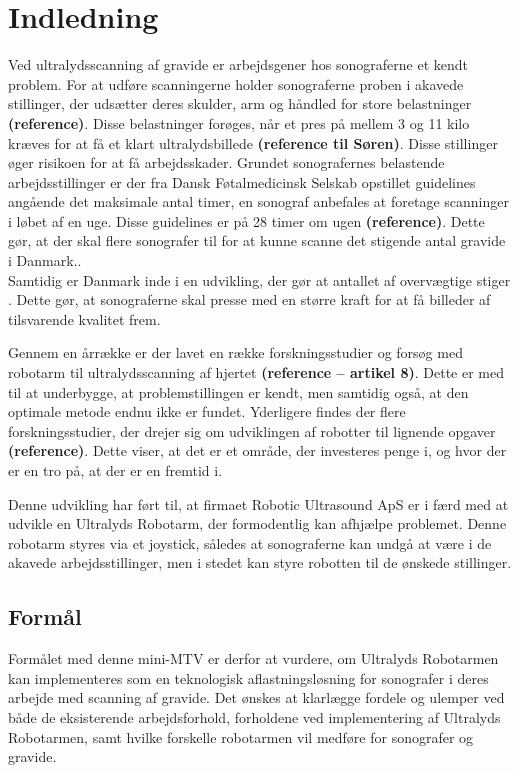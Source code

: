 \chapter{Indledning} 
Ved ultralydsscanning af gravide er arbejdsgener hos sonograferne et kendt problem. For at udføre scanningerne holder sonograferne proben i akavede stillinger, der udsætter deres skulder, arm og håndled for store belastninger \textbf{(reference)}. Disse belastninger forøges, når et pres på mellem 3 og 11 kilo kræves for at få et klart ultralydsbillede \textbf{(reference til Søren)}. Disse stillinger øger risikoen for at få arbejdsskader. Grundet sonografernes belastende arbejdsstillinger er der fra Dansk Føtalmedicinsk Selskab opstillet guidelines angående det maksimale antal timer, en sonograf anbefales at foretage scanninger i løbet af en uge. Disse guidelines er på 28 timer om ugen \textbf{(reference)}. Dette gør, at der skal flere sonografer til for at kunne scanne det stigende antal gravide i Danmark.\cite{Foedsler}. \\
Samtidig er Danmark inde i en udvikling, der gør at antallet af overvægtige stiger \cite{Overvaegt}. Dette gør, at sonograferne skal presse med en større kraft for at få billeder af tilsvarende kvalitet frem. 

Gennem en årrække er der lavet en række forskningsstudier og forsøg med robotarm til ultralydsscanning af hjertet \textbf{(reference – artikel 8)}. Dette er med til at underbygge, at problemstillingen er kendt, men samtidig også, at den optimale metode endnu ikke er fundet. Yderligere findes der flere forskningsstudier, der drejer sig om udviklingen af robotter til lignende opgaver \textbf{(reference)}. Dette viser, at det er et område, der investeres penge i, og hvor der er en tro på, at der er en fremtid i. 

Denne udvikling har ført til, at firmaet Robotic Ultrasound ApS er i færd med at udvikle en Ultralyds Robotarm, der formodentlig kan afhjælpe problemet. Denne robotarm styres via et joystick, således at sonograferne kan undgå at være i de akavede arbejdsstillinger, men i stedet kan styre robotten til de ønskede stillinger. 


\section{Formål}
Formålet med denne mini-MTV er derfor at vurdere, om Ultralyds Robotarmen kan implementeres som en teknologisk aflastningsløsning for sonografer i deres arbejde med scanning af gravide. Det ønskes at klarlægge fordele og ulemper ved både de eksisterende arbejdsforhold, forholdene ved implementering af Ultralyds Robotarmen, samt hvilke forskelle robotarmen vil medføre for sonografer og gravide.

